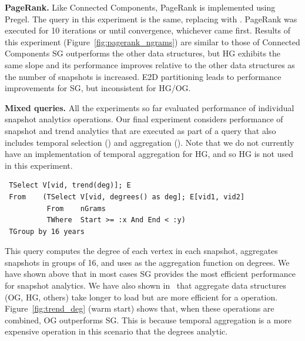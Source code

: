 
{\bf PageRank.} Like Connected Components, PageRank is implemented
using Pregel.  The query in this experiment is the same, replacing
 with .  PageRank was executed for
10 iterations or until convergence, whichever came first.  Results of
this experiment (Figure~\ref{fig:pagerank_ngrams}) are similar to
those of Connected Components SG outperforms the other data
structures, but HG exhibits the same slope and its performance
improves relative to the other data structures as the number of
snapshots is increased.  E2D partitioning leads to performance
improvements for SG, but inconsistent for HG/OG.


{\bf Mixed queries.} All the experiments so far evaluated performance
of individual \ql snapshot analytics operations.  Our final experiment
considers performance of snapshot and trend analytics that are
executed as part of a query that also includes temporal selection
() and aggregation ().  Note that we do
not currently have an implementation of temporal aggregation for HG,
and so HG is not used in this experiment.

\begin{small}
\begin{verbatim}
 TSelect V[vid, trend(deg)]; E
 From    (TSelect V[vid, degrees() as deg]; E[vid1, vid2]
          From    nGrams
          TWhere  Start >= :x And End < :y)
 TGroup by 16 years
\end{verbatim}
\end{small}

This query computes the degree of each vertex in each snapshot,
aggregates snapshots in groups of 16, and uses  as the
aggregation function on degrees.  We have shown above that in most
cases SG provides the most efficient performance for snapshot
analytics.  We have also shown in~\cite{PortalarXiv2016} that
aggregate data structures (OG, HG, others) take longer to load but are
more efficient for a  operation.
Figure~\ref{fig:trend_deg} (warm start) shows that, when these
operations are combined, OG outperforms SG.  This is because temporal
aggregation is a more expensive operation in this scenario that the
degrees analytic.


